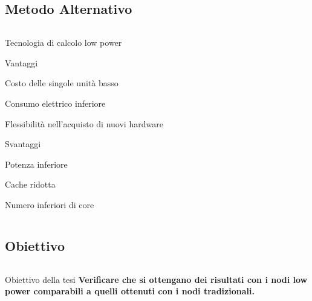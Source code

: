 \documentclass{beamer}
\begin{document}
\subsection{Metodo Alternativo}
\begin{frame}
\begin{columns}
\begin{column}{0.8\linewidth}		
\begin{block}{Tecnologia di calcolo low power}
\begin{itemize}
\begin{block}{Vantaggi}
\small
\item Costo delle singole unità basso
\item Consumo elettrico inferiore
\item Flessibilità nell'acquisto di nuovi hardware
\end{block}
\begin{block}{Svantaggi}
\small
\item Potenza inferiore
\item Cache ridotta
\item Numero inferiori di core
\end{block}
\end{itemize}
\end{block}
\end{column}
\end{columns}
\end{frame}

\subsection{Obiettivo}
\begin{frame}
\begin{columns}
\begin{column}{0.8\linewidth}		
\begin{block}{Obiettivo della tesi}
\small
\textbf{Verificare che si ottengano dei risultati con i nodi low power
comparabili a quelli ottenuti con i nodi tradizionali.}
\end{block}
\end{column}
\end{columns}
\end{frame}
\end{document}
